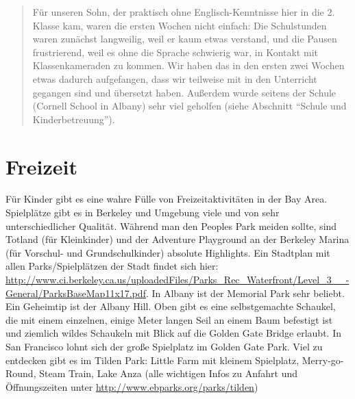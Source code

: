 \documentclass[a4paper]{scrreprt}
\begin{document}
\begin{quote}
Für unseren Sohn, der praktisch ohne Englisch-Kenntnisse hier in die 2. Klasse kam, waren die ersten Wochen nicht einfach: Die Schulstunden waren zunächst langweilig, weil er kaum etwas verstand, und die Pausen frustrierend, weil es ohne die Sprache schwierig war, in Kontakt mit Klassenkameraden zu kommen. Wir haben das in den ersten zwei Wochen etwas dadurch aufgefangen, dass wir teilweise mit in den Unterricht gegangen sind und übersetzt haben. Außerdem wurde seitens der Schule (Cornell School in Albany) sehr viel geholfen (siehe Abschnitt "`Schule und Kinderbetreuung"').
\end{quote}

\section{Freizeit}

Für Kinder gibt es eine wahre Fülle von Freizeitaktivitäten in der Bay Area. Spielplätze gibt es in Berkeley und Umgebung viele und von sehr unterschiedlicher Qualität. Während man den Peoples Park meiden sollte, sind Totland (für Kleinkinder) und der Adventure Playground an der Berkeley Marina (für Vorschul- und Grundschulkinder) absolute Highlights. 
Ein Stadtplan mit allen Parks/Spielplätzen der Stadt findet sich hier: \url{http://www.ci.berkeley.ca.us/uploadedFiles/Parks\_Rec\_Waterfront/Level\_3\_\_-General/ParksBaseMap11x17.pdf}.
In Albany ist der Memorial Park sehr beliebt. Ein Geheimtip ist der Albany Hill. Oben gibt es eine selbstgemachte Schaukel, die mit einem einzelnen, einige Meter langen Seil an einem Baum befestigt ist und ziemlich wildes Schaukeln mit Blick auf die Golden Gate Bridge erlaubt. In San Francisco lohnt sich der große Spielplatz im Golden Gate Park. Viel zu entdecken gibt es im Tilden Park:
Little Farm mit kleinem Spielplatz, Merry-go-Round, Steam Train, Lake Anza (alle wichtigen Infos zu Anfahrt und Öffnungszeiten unter \url{http://www.ebparks.org/parks/tilden})
\end{document}
